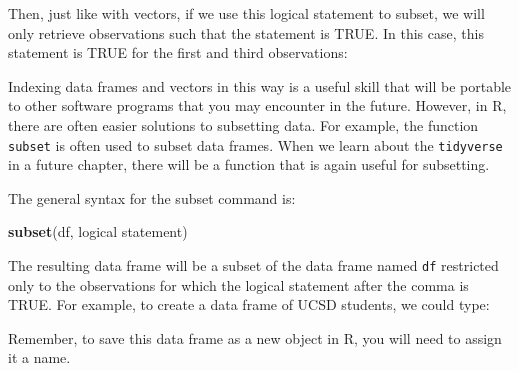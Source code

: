 \documentclass[
]{book}
\newenvironment{Shaded}{\begin{snugshade}}{\end{snugshade}}
\newcommand{\DecValTok}[1]{\textcolor[rgb]{0.00,0.00,0.81}{#1}}
\newcommand{\FunctionTok}[1]{\textcolor[rgb]{0.13,0.29,0.53}{\textbf{#1}}}
\newcommand{\NormalTok}[1]{#1}
\newcommand{\SpecialCharTok}[1]{\textcolor[rgb]{0.81,0.36,0.00}{\textbf{#1}}}
\newcommand{\StringTok}[1]{\textcolor[rgb]{0.31,0.60,0.02}{#1}}
\begin{document}
Then, just like with vectors, if we use this logical statement to subset, we will only retrieve observations such that the statement is TRUE. In this case, this statement is TRUE for the first and third observations:

\begin{Shaded}
\end{Shaded}

Indexing data frames and vectors in this way is a useful skill that will be portable to other software programs that you may encounter in the future. However, in R, there are often easier solutions to subsetting data. For example, the function \texttt{subset} is often used to subset data frames. When we learn about the \texttt{tidyverse} in a future chapter, there will be a function that is again useful for subsetting.

The general syntax for the subset command is:

\begin{Shaded}
\begin{Highlighting}[]
\FunctionTok{subset}\NormalTok{(df, logical statement)}
\end{Highlighting}
\end{Shaded}

The resulting data frame will be a subset of the data frame named \texttt{df} restricted only to the observations for which the logical statement after the comma is TRUE. For example, to create a data frame of UCSD students, we could type:

\begin{Shaded}
\end{Shaded}

Remember, to save this data frame as a new object in R, you will need to assign it a name.
\end{document}
